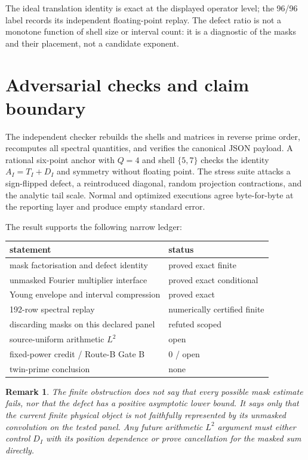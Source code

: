 \documentclass[10pt]{article}
\newtheorem{remark}{Remark}
\begin{document}
The ideal translation identity is exact at the displayed operator level; the
96/96 label records its independent floating-point replay.  The defect ratio
is not a monotone function of shell size or interval count: it is a diagnostic
of the masks and their placement, not a candidate exponent.

\section{Adversarial checks and claim boundary}

The independent checker rebuilds the shells and matrices in reverse prime
order, recomputes all spectral quantities, and verifies the canonical JSON
payload.  A rational six-point anchor with $Q=4$ and shell $\{5,7\}$ checks
the identity $A_I=T_I+D_I$ and symmetry without floating point.  The stress
suite attacks a sign-flipped defect, a reintroduced diagonal, random
projection contractions, and the analytic tail scale.  Normal and optimized
executions agree byte-for-byte at the reporting layer and produce empty
standard error.

The result supports the following narrow ledger:

\begin{center}
\begin{tabular}{ll}
\toprule
statement & status \\
\midrule
mask factorisation and defect identity & proved exact finite \\
unmasked Fourier multiplier interface & proved exact conditional \\
Young envelope and interval compression & proved exact \\
192-row spectral replay & numerically certified finite \\
discarding masks on this declared panel & refuted scoped \\
source-uniform arithmetic $L^2$ & open \\
fixed-power credit / Route-B Gate B & $0$ / open \\
twin-prime conclusion & none \\
\bottomrule
\end{tabular}
\end{center}

\begin{remark}
The finite obstruction does not say that every possible mask estimate fails,
nor that the defect has a positive asymptotic lower bound.  It says only that
the current finite physical object is not faithfully represented by its
unmasked convolution on the tested panel.  Any future arithmetic $L^2$
argument must either control $D_I$ with its position dependence or prove
cancellation for the masked sum directly.
\end{remark}
\end{document}
